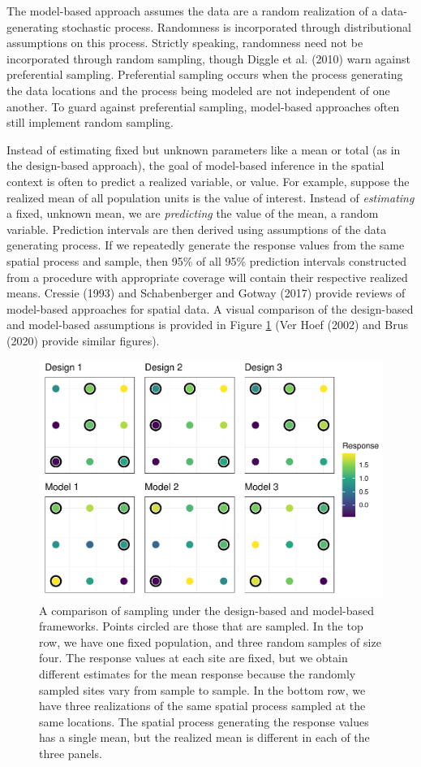 \documentclass[]{elsarticle} %
\begin{document}
The model-based approach assumes the data are a random realization of a
data-generating stochastic process. Randomness is incorporated through
distributional assumptions on this process. Strictly speaking,
randomness need not be incorporated through random sampling, though
Diggle et al. (2010) warn against preferential sampling. Preferential
sampling occurs when the process generating the data locations and the
process being modeled are not independent of one another. To guard
against preferential sampling, model-based approaches often still
implement random sampling.

Instead of estimating fixed but unknown parameters like a mean or total
(as in the design-based approach), the goal of model-based inference in
the spatial context is often to predict a realized variable, or value.
For example, suppose the realized mean of all population units is the
value of interest. Instead of \emph{estimating} a fixed, unknown mean,
we are \emph{predicting} the value of the mean, a random variable.
Prediction intervals are then derived using assumptions of the data
generating process. If we repeatedly generate the response values from
the same spatial process and sample, then 95\% of all 95\% prediction
intervals constructed from a procedure with appropriate coverage will
contain their respective realized means. Cressie (1993) and
Schabenberger and Gotway (2017) provide reviews of model-based
approaches for spatial data. A visual comparison of the design-based and
model-based assumptions is provided in Figure \ref{fig:fig1} (Ver Hoef
(2002) and Brus (2020) provide similar figures).

\begin{figure}
\includegraphics[width=1\linewidth]{manuscript_files/figure-latex/fig1-1} \caption{A comparison of sampling under the design-based and model-based frameworks. Points circled are those that are sampled. In the top row, we have one fixed population, and three random samples of size four. The response values at each site are fixed, but we obtain different estimates for the mean response because the randomly sampled sites vary from sample to sample. In the bottom row, we have three realizations of the same spatial process sampled at the same locations. The spatial process generating the response values has a single mean, but the realized mean is different in each of the three panels.}\label{fig:fig1}
\end{figure}
\end{document}
